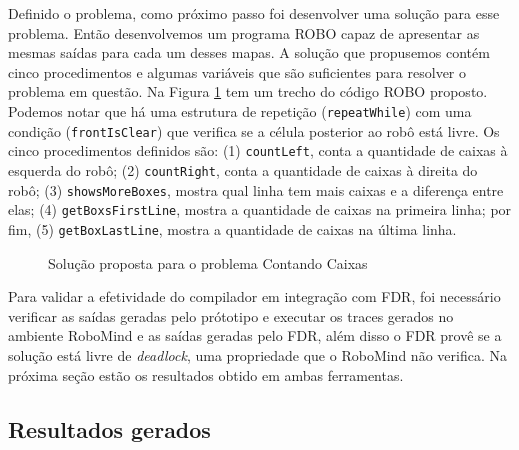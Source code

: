 Definido o problema, como próximo passo foi desenvolver uma solução para esse problema. Então desenvolvemos um programa ROBO capaz de apresentar as mesmas saídas para cada um desses mapas. A solução que propusemos contém cinco procedimentos e algumas variáveis que são suficientes para resolver o problema em questão. Na Figura \ref{fig:solution} tem um trecho do código ROBO proposto. Podemos notar que há uma estrutura de repetição (\texttt{repeatWhile}) com uma condição (\texttt{frontIsClear}) que verifica se a célula posterior ao robô está livre. Os cinco procedimentos definidos são: (1) \texttt{countLeft}, conta a quantidade de caixas à esquerda do robô; (2) \texttt{countRight}, conta a quantidade de caixas à direita do robô; (3) \texttt{showsMoreBoxes}, mostra qual linha tem mais caixas e a diferença entre elas; (4) \texttt{getBoxsFirstLine}, mostra a quantidade de caixas na primeira linha; por fim, (5) \texttt{getBoxLastLine}, mostra a quantidade de caixas na última linha.

\begin{figure}[h]
\centering
\caption{Solução proposta para o problema Contando Caixas}

\label{fig:solution}
\end{figure}

Para validar a efetividade do compilador em integração com FDR, foi necessário verificar as saídas geradas pelo prótotipo e executar os traces gerados no ambiente RoboMind e as saídas geradas pelo FDR, além disso o FDR provê se a solução está livre de \textit{deadlock}, uma propriedade que o RoboMind não verifica. Na próxima seção estão os resultados obtido em ambas ferramentas.

\subsection{Resultados gerados}
\label{sub:sec43}

